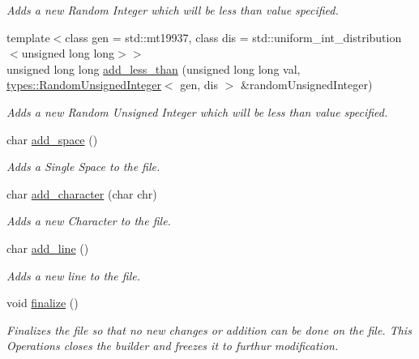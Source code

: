 \begin{DoxyCompactItemize}
\begin{DoxyCompactList}\small\item\em Adds a new Random Integer which will be less than value specified. \end{DoxyCompactList}\item 
{\footnotesize template$<$class gen  = std\+::mt19937, class dis  = std\+::uniform\+\_\+int\+\_\+distribution$<$unsigned long long$>$$>$ }\\unsigned long long \hyperlink{classtestcaser_1_1maker_1_1TestCaseBuilder_abc8a125ff2b991fc530a8263ba10ff3f}{add\+\_\+less\+\_\+than} (unsigned long long val, \hyperlink{classtestcaser_1_1maker_1_1types_1_1RandomUnsignedInteger}{types\+::\+Random\+Unsigned\+Integer}$<$ gen, dis $>$ \&random\+Unsigned\+Integer)
\begin{DoxyCompactList}\small\item\em Adds a new Random Unsigned Integer which will be less than value specified. \end{DoxyCompactList}\item 
char \hyperlink{classtestcaser_1_1maker_1_1TestCaseBuilder_a5c23f3b3d3533c48477741da8337af98}{add\+\_\+space} ()
\begin{DoxyCompactList}\small\item\em Adds a Single Space to the file. \end{DoxyCompactList}\item 
char \hyperlink{classtestcaser_1_1maker_1_1TestCaseBuilder_a41885a504a99f9c450e793e183898488}{add\+\_\+character} (char chr)
\begin{DoxyCompactList}\small\item\em Adds a new Character to the file. \end{DoxyCompactList}\item 
char \hyperlink{classtestcaser_1_1maker_1_1TestCaseBuilder_abdb7ac9e7f1036c4b84adf48bb019cfa}{add\+\_\+line} ()
\begin{DoxyCompactList}\small\item\em Adds a new line to the file. \end{DoxyCompactList}\item 
\mbox{\label{classtestcaser_1_1maker_1_1TestCaseBuilder_a235c9c4e34fe708831cf300f812fbaed}} 
void \hyperlink{classtestcaser_1_1maker_1_1TestCaseBuilder_a235c9c4e34fe708831cf300f812fbaed}{finalize} ()
\begin{DoxyCompactList}\small\item\em Finalizes the file so that no new changes or addition can be done on the file. This Operations closes the builder and freezes it to furthur modification. \end{DoxyCompactList}\item 

\end{DoxyCompactItemize}
